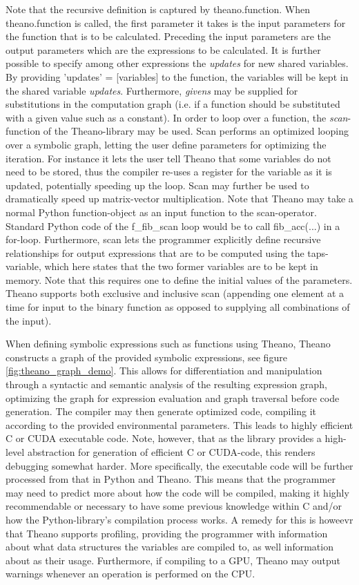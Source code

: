 Note that the recursive definition is captured by theano.function. When theano.function is called, the first parameter it takes is the input parameters for the function that is to be calculated.
Preceding the input parameters are the output parameters which are the expressions to be calculated. It is further possible to specify among other expressions the \textit{updates} for new shared variables. By providing 'updates' = [variables] to the function, the variables will be kept in the shared variable \textit{updates}. Furthermore, \textit{givens} may be supplied for substitutions in the computation graph (i.e. if a function should be substituted with a given value such as a constant).
In order to loop over a function, the \textit{scan}-function of the Theano-library may be used. Scan performs an optimized looping over a symbolic graph, letting the user define parameters for optimizing the iteration. For instance it lets the user tell Theano that some variables do not need to be stored, thus the compiler re-uses a register for the variable as it is updated, potentially speeding up the loop. Scan may further be used to dramatically speed up matrix-vector multiplication.
Note that Theano may take a normal Python function-object as an input function to the scan-operator. Standard Python code of the f\_fib\_scan loop would be to call fib\_acc(...) in a for-loop. Furthermore, scan lets the programmer explicitly define recursive relationships for output expressions that are to be computed using the taps-variable, which here states that the two former variables are to be kept in memory. Note that this requires one to define the initial values of the parameters. Theano supports both exclusive and inclusive scan (appending one element at a time for input to the binary function as opposed to supplying all combinations of the input).

When defining symbolic expressions such as functions using Theano, Theano constructs a graph of the provided symbolic expressions, see figure \ref{fig:theano_graph_demo}. This allows for differentiation and manipulation through a syntactic and semantic analysis of the resulting expression graph, optimizing the graph for expression evaluation and graph traversal before code generation. The compiler may then generate optimized code, compiling it according to the provided environmental parameters. This leads to highly efficient C or CUDA executable code.
Note, however, that as the library provides a high-level abstraction for generation of efficient C or CUDA-code, this renders debugging somewhat harder. More specifically, the executable code will be further processed from that in Python and Theano. This means that the programmer may need to predict more about how the code will be compiled, making it highly recommendable or necessary to have some previous knowledge within C and/or how the Python-library's compilation process works. A remedy for this is howeevr that Theano supports profiling, providing the programmer with information about what data structures the variables are compiled to, as well information about as their usage. Furthermore, if compiling to a GPU, Theano may output warnings whenever an operation is performed on the CPU.

